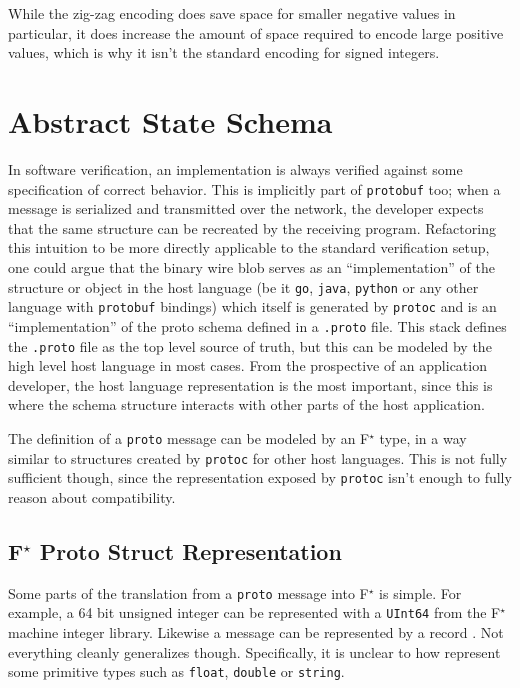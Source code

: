 \documentclass[11pt]{article}
\theoremstyle{definition}
\theoremstyle{plain}
\newcommand{\fstar}{F$^\star$}
\begin{document}
While the zig-zag encoding does save space for smaller negative values in
particular, it does increase the amount of space required to encode large
positive values, which is why it isn't the standard encoding for signed
integers. 

\section{Abstract State Schema}

In software verification, an implementation is always verified against some
specification of correct behavior. This is implicitly part of
\texttt{protobuf} too; when a message is serialized and transmitted over the
network, the developer expects that the same structure can be recreated by the
receiving program. Refactoring this intuition to be more directly applicable to
the standard verification setup, one could argue that the binary wire blob
serves as an ``implementation'' of the structure or object in the host
language (be it \texttt{go}, \texttt{java}, \texttt{python} or any other
language with \texttt{protobuf} bindings) which itself is generated by
\texttt{protoc} and is an ``implementation'' of the proto schema defined in a
\texttt{.proto} file. This stack defines the \texttt{.proto} file as the top
level source of truth, but this can be modeled by the high level host language
in most cases. From the prospective of an application developer, the host
language representation is the most important, since this is where the schema
structure interacts with other parts of the host application.

The definition of a \texttt{proto} message can be modeled by an \fstar{} type,
in a way similar to structures created by \texttt{protoc} for other host
languages. This is not fully sufficient though, since the representation
exposed by \texttt{protoc} isn't enough to fully reason about compatibility.

\subsection{\fstar{} Proto Struct Representation}

Some parts of the translation from a \texttt{proto} message
\autocite{LanguageGuideProto} into \fstar{} is simple. For example, a 64 bit
unsigned integer can be represented with a \texttt{UInt64} from the \fstar{}
machine integer library. Likewise a message can be represented by a record
\autocite{swamy2023proof}. Not everything cleanly generalizes
though. Specifically, it is unclear to how represent some primitive types such
as \texttt{float}, \texttt{double} or \texttt{string}.
\end{document}
